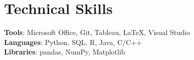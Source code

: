 \documentclass[letterpaper,11pt]{article}
\begin{document}
%
\section{Technical Skills}
 \begin{itemize}[leftmargin=0.15in, label={}]
    \small{\item{
     \textbf{Tools}{: Microsoft Office, Git, Tableau, LaTeX, Visual Studio} \\
     \textbf{Languages}{: Python, SQL, R, Java, C/C++} \\
     \textbf{Libraries}{: pandas, NumPy, Matplotlib}
    }}
 \end{itemize}


\end{document}
